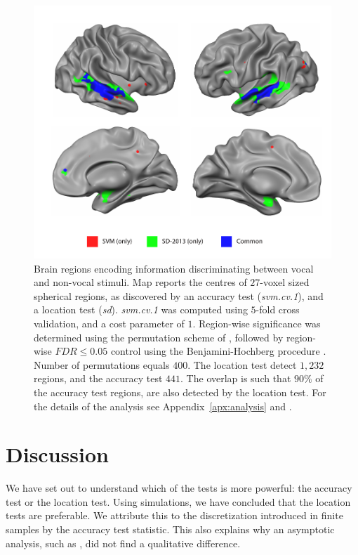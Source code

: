 \documentclass[12pt,a4paper]{article}
\begin{document}
\begin{figure}[th]
\centering
\includegraphics[width=0.7\linewidth]{"art/svm_vs_SD"}
\caption{\footnotesize
Brain regions encoding information discriminating between vocal and non-vocal stimuli.
Map reports the centres of $27$-voxel sized spherical regions, as discovered by an accuracy test (\emph{svm.cv.1}), and a location test (\emph{sd}). 
\emph{svm.cv.1} was computed using $5$-fold cross validation, and a cost parameter of $1$. 
Region-wise significance was determined using the permutation scheme of \cite{stelzer_statistical_2013}, followed by region-wise $FDR \leq 0.05$ control using the Benjamini-Hochberg procedure \citep{benjamini_controlling_1995}.
Number of permutations equals $400$.
The location test detect $1,232$ regions, and the accuracy test $441$. The overlap is such that $90\%$ of the accuracy test regions, are also detected by the location test. 
For the details of the analysis see Appendix~\ref{apx:analysis} and \cite{gilron_quantifying_2016}.  
  }
\label{fig:read_data}
\end{figure}








\section{Discussion}
\label{sec:discussion}


We have set out to understand which of the tests is more powerful: the accuracy test or the location test. 
Using simulations, we have concluded that the location tests are preferable. 
We attribute this to the discretization introduced in finite samples by the accuracy test statistic. 
This also explains why an asymptotic analysis, such as \cite{ramdas_classification_2016}, did not find a qualitative difference. 
\end{document}
